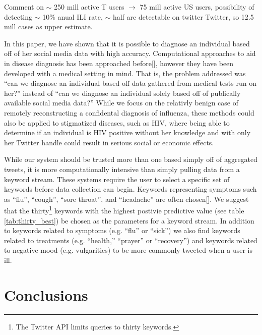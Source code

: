 \documentclass{acm_proc_article-sp}
\begin{document}
Comment on \(\sim\) 250 mill active T users \(\to\) 75 mill active US users, possibility of detecting \(\sim\) 10\% anual ILI rate, \(\sim\) half are detectable on twitter Twitter, so 12.5 mill cases as upper estimate.


In this paper, we have shown that it is possible to diagnose an individual based off of her social media data with high accuracy. Computational approaches to aid in disease diagnosis has been approached before[], however they have been developed with a medical setting in mind. That is, the problem addressed was ``can we diagnose an individual based off data gathered from medical tests run on her?'' instead of ``can we diagnose an individual solely based off of publically available social media data?''  While we focus on the relativly benign case of remotely reconstructing a confidental diagnosis of influenza, these methods could also be applied to stigmatized diseases, such as HIV, where being able to determine if an individual is HIV positive without her knowledge and with only her Twitter handle could result in serious social or economic effects.

While our system should be trusted more than one based simply off of aggregated tweets, it is more computationally intensive than simply pulling data from a keyword stream. These systems require the user to select a specific set of keywords before data collection can begin. Keywords representing symptoms such as ``flu'', ``cough'', ``sore throat'', and ``headache'' are often chosen[]. We suggest that the thirty\footnote{The Twitter API limits queries to thirty keywords.} keywords with the highest postivie predictive value (see table \ref{tab:thirty_best}) be chosen as the parameters for a keyword stream. In addition to keywords related to symptoms (e.g. ``flu'' or ``sick'') we also find keywords related to treatments (e.g. ``health,'' ``prayer'' or ``recovery'') and keywords related to negative mood (e.g. vulgarities) to be more commonly tweeted when a user is ill. 

\section{Conclusions}


\end{document}
